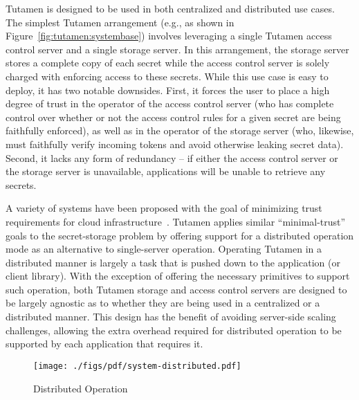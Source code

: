 Tutamen is designed to be used in both centralized and distributed use
cases. The simplest Tutamen arrangement (e.g., as shown in
Figure~\ref{fig:tutamen:systembase}) involves leveraging a single
Tutamen access control server and a single storage server. In this
arrangement, the storage server stores a complete copy of each secret
while the access control server is solely charged with enforcing
access to these secrets. While this use case is easy to deploy, it has
two notable downsides. First, it forces the user to place a high
degree of trust in the operator of the access control server (who has
complete control over whether or not the access control rules for a
given secret are being faithfully enforced), as well as in the
operator of the storage server (who, likewise, must faithfully verify
incoming tokens and avoid otherwise leaking secret data). Second, it
lacks any form of redundancy -- if either the access control server or
the storage server is unavailable, applications will be unable to
retrieve any secrets.

A variety of systems have been proposed with the goal of minimizing
trust requirements for cloud infrastructure~\cite{bessani2011,
  kallahalla2003, kubiatowicz2000, mahajan2011,
  wilcox-o'hearn2008}. Tutamen applies similar ``minimal-trust'' goals
to the secret-storage problem by offering support for a distributed
operation mode as an alternative to single-server operation. Operating
Tutamen in a distributed manner is largely a task that is pushed down
to the application (or client library). With the exception of offering
the necessary primitives to support such operation, both Tutamen
storage and access control servers are designed to be largely agnostic
as to whether they are being used in a centralized or a distributed
manner. This design has the benefit of avoiding server-side scaling
challenges, allowing the extra overhead required for distributed
operation to be supported by each application that requires it.

\begin{figure}[th]
  \centering
  \texttt{[image: ./figs/pdf/system-distributed.pdf]}
  \caption{Distributed Operation}
  \label{fig:tutamen:systemdistributed}
\end{figure}

